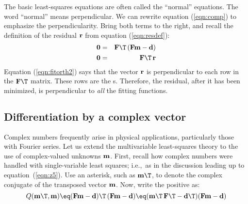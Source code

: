 \par
The basic least-squares equations are often called
the ``normal'' equations. 
The word ``normal'' means perpendicular.
We can rewrite equation
(\ref{eqn:comp})
to emphasize the perpendicularity.
Bring both terms to the right,
and recall the definition of the residual $\bold r$
from equation (\ref{eqn:resdef}):
\begin{eqnarray}
\label{eqn:fitorth1}
\bold 0  &=& \bold F\T\,( \bold F   \bold m - \dd)  \\
\bold 0  &=& \bold F\T\,\bold r 
\label{eqn:fitorth2}
\end{eqnarray}
Equation (\ref{eqn:fitorth2}) says that the  vector $\bold r$
is perpendicular to
each row in the $\bold F\T$ matrix.
These rows are the s.
Therefore, the residual, after it has been minimized,
is perpendicular to
{\it all}
the fitting functions.

\subsection{Differentiation by a complex vector}

\par
Complex numbers frequently arise in physical applications,
particularly those with Fourier series.
Let us extend the multivariable least-squares theory
to the use of complex-valued unknowns $\bold m$.
First,
recall how complex numbers were handled
with single-variable least squares;
i.e.,~as in the discussion leading up to equation~(\ref{eqn:z5}).
Use an asterisk, such as $\bold m\T$, to denote the complex conjugate
of the transposed vector $\bold m$.
Now, write the positive  as:
\begin{equation}
Q(\bold m\T, \bold m) \eq
(\bold F\bold m - \bold d)\T\,
(\bold F\bold m - \bold d)
\eq
(\bold m\T\,\bold F\T - \bold d\T)
(\bold F\bold m - \bold d)
\label{eqn:6-1-23}
\end{equation}

